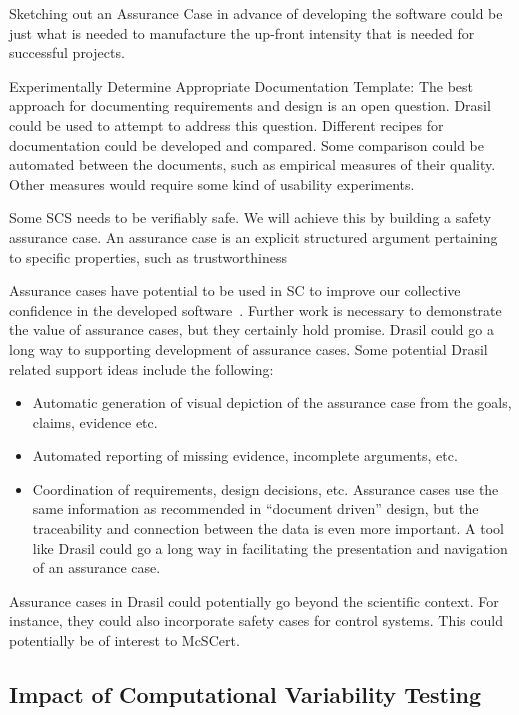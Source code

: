\documentclass[12pt]{article}
\begin{document}
Sketching out an Assurance Case in advance of developing the software could be
just what is needed to manufacture the up-front intensity that is needed for
successful projects.

Experimentally Determine Appropriate Documentation Template: The best approach
for documenting requirements and design is an open question.  Drasil could be
used to attempt to address this question.  Different recipes for documentation
could be developed and compared.  Some comparison could be automated between the
documents, such as empirical measures of their quality.  Other measures would
require some kind of usability experiments.

Some SCS needs to be verifiably safe.  We will achieve this by building a safety
assurance case. An assurance case is an explicit structured argument pertaining
to specific properties, such as trustworthiness

Assurance cases have potential to be used in SC to improve our collective
confidence in the developed software~\cite{SmithEtAl2018_ICSEPoster}.  Further
work is necessary to demonstrate the value of assurance cases, but they
certainly hold promise.  Drasil could go a long way to supporting development of
assurance cases.  Some potential Drasil related support ideas include the
following:

\begin{itemize}
\item Automatic generation of visual depiction of the assurance case from the
  goals, claims, evidence etc.
\item Automated reporting of missing evidence, incomplete arguments, etc.
\item Coordination of requirements, design decisions, etc.  Assurance cases use
  the same information as recommended in ``document driven'' design, but the
  traceability and connection between the data is even more important.  A tool
  like Drasil could go a long way in facilitating the presentation and
  navigation of an assurance case.
\end{itemize}

Assurance cases in Drasil could potentially go beyond the scientific context.
For instance, they could also incorporate safety cases for
control systems.  This could potentially be of interest to McSCert.

\subsection{Impact of Computational Variability Testing} \label{SecCVT}
\end{document}
